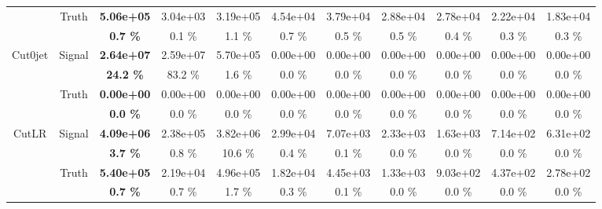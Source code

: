 \begin{appendices}
\begin{landscape}
\begin{table}
\begin{tabular}{|c|c|>{\bfseries}c|c|c|c|c|c|c|c|c|}
    \cline{2-11}                                                                                    
                                    & \multirow{2}{*}{Truth}    & 5.06e+05 & 3.04e+03 & 3.19e+05 & 4.54e+04 & 3.79e+04 & 2.88e+04 & 2.78e+04 & 2.22e+04 & 1.83e+04 \\
                                    &                           & 0.7 \%   & 0.1 \%   & 1.1 \%   & 0.7 \%   & 0.5 \%   & 0.5 \%   & 0.4 \%   & 0.3 \%   & 0.3 \%   \\
    \hline                                                                                      
    \hline                                                                                      
    \multirow{4}{*}{Cut0jet}        & \multirow{2}{*}{Signal}   & 2.64e+07 & 2.59e+07 & 5.70e+05 & 0.00e+00 & 0.00e+00 & 0.00e+00 & 0.00e+00 & 0.00e+00 & 0.00e+00 \\
                                    &                           & 24.2 \%  & 83.2 \%  & 1.6 \%   & 0.0 \%   & 0.0 \%   & 0.0 \%   & 0.0 \%   & 0.0 \%   & 0.0 \%   \\
    \cline{2-11}                                                                                    
                                    & \multirow{2}{*}{Truth}    & 0.00e+00 & 0.00e+00 & 0.00e+00 & 0.00e+00 & 0.00e+00 & 0.00e+00 & 0.00e+00 & 0.00e+00 & 0.00e+00 \\
                                    &                           & 0.0 \%   & 0.0 \%   & 0.0 \%   & 0.0 \%   & 0.0 \%   & 0.0 \%   & 0.0 \%   & 0.0 \%   & 0.0 \%   \\
    \hline                                                                                      
    \hline                                                                                      
    \multirow{4}{*}{CutLR}          & \multirow{2}{*}{Signal}   & 4.09e+06 & 2.38e+05 & 3.82e+06 & 2.99e+04 & 7.07e+03 & 2.33e+03 & 1.63e+03 & 7.14e+02 & 6.31e+02 \\
                                    &                           & 3.7 \%   & 0.8 \%   & 10.6 \%  & 0.4 \%   & 0.1 \%   & 0.0 \%   & 0.0 \%   & 0.0 \%   & 0.0 \%   \\
    \cline{2-11}                                                                                    
                                    & \multirow{2}{*}{Truth}    & 5.40e+05 & 2.19e+04 & 4.96e+05 & 1.82e+04 & 4.45e+03 & 1.33e+03 & 9.03e+02 & 4.37e+02 & 2.78e+02 \\
                                    &                           & 0.7 \%   & 0.7 \%   & 1.7 \%   & 0.3 \%   & 0.1 \%   & 0.0 \%   & 0.0 \%   & 0.0 \%   & 0.0 \%   \\

\end{tabular}
\end{table}
\end{landscape}
\end{appendices}
